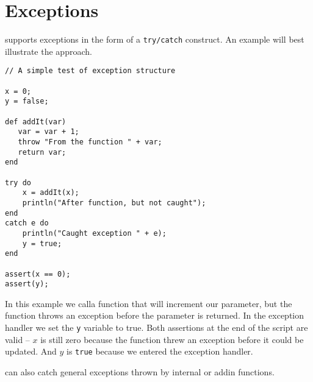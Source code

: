 \chapter{Exceptions}
\Reflex supports exceptions in the form of a \Verb+try/catch+ construct. An example will best illustrate the approach.
\begin{lstlisting}[caption={Exception handling}]
// A simple test of exception structure

x = 0;
y = false;

def addIt(var)
   var = var + 1;
   throw "From the function " + var;
   return var;
end

try do
    x = addIt(x);
    println("After function, but not caught");
end
catch e do
    println("Caught exception " + e);
    y = true;
end

assert(x == 0);
assert(y);

\end{lstlisting}

In this example we calla function that will increment our parameter, but the function throws an exception before the parameter is returned. In the exception handler we set the \Verb+y+ variable to true. Both assertions at the end of the script are valid -- $x$ is still zero because the function threw an exception before it could be updated. And $y$ is \verb+true+ because we entered the exception handler.

\Reflex can also catch general exceptions thrown by internal or addin functions.
